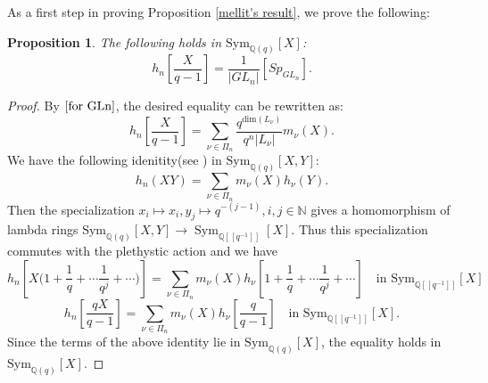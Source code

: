 \documentclass{amsart}
\theoremstyle{plain}
\newtheorem{proposition}{Proposition}[section]
\theoremstyle{definition}
\theoremstyle{remark}
\DeclareMathOperator{\Sym}{Sym}
\begin{document}
As a first step in proving Proposition \ref{mellit's result}, we prove the following:
\begin{proposition}\label{sp=hn}
The following holds in $\text{Sym}_{\mathbb{Q}(q)}[X]$:
\[
h_{n}\left[\frac{X}{q-1}\right]=\frac{1}{|GL_{n}|}[Sp_{GL_{n}}].
\]
\end{proposition}
\begin{proof}
By $\eqref{for GLn}$, the desired equality can be rewritten as:
\begin{equation}\label{0}
h_{n}\left[\frac{X}{q-1}\right]=\displaystyle\sum_{\nu\in\Pi_{n}}\frac{q^{\text{dim}(L_{\nu})}}{q^{n}|L_{\nu}|}m_{\nu}(X).
\end{equation}
We have the following idenitity(see \cite[Chapter 4, Section 2]{Mac}) in $\text{Sym}_{\mathbb{Q}(q)}[X,Y]$:
\begin{equation}\label{3}
    h_n(XY)=\sum_{\nu\in\Pi_{n}}m_{\nu}(X)h_{\nu}(Y).
\end{equation}
Then the specialization $x_{i}\mapsto x_{i},y_{j}\mapsto q^{-(j-1)},i,j\in\mathbb{N}$ gives a homomorphism of lambda rings $\text{Sym}_{\mathbb{Q}(q)}[X,Y]\rightarrow \Sym_{\mathbb{Q}[[q^{-1}]]}[X]$. Thus this specialization commutes with the plethystic action and we have
\[
h_{n}\left[X\bigg(1+\frac{1}{q}+\cdots\frac{1}{q^{j}}+\cdots\bigg)\right]
=
\sum_{\nu\in\Pi_{n}}m_{\nu}(X)h_{\nu}\left[1+\frac{1}{q}+\cdots\frac{1}{q^{j}}+\cdots\right]\quad \text{in } \text{Sym}_{\mathbb{Q}[[q^{-1}]]}[X]
\]
\[
h_{n}\left[\frac{qX}{q-1}\right]
=
\sum_{\nu\in\Pi_{n}}m_{\nu}(X)h_{\nu}\left[\frac{q}{q-1}\right]\quad \text{in } \text{Sym}_{\mathbb{Q}[[q^{-1}]]}[X].
\]
Since the terms of the above identity lie in $\text{Sym}_{\mathbb{Q}(q)}[X]$, the equality holds in $\text{Sym}_{\mathbb{Q}(q)}[X]$.


\end{proof}
\end{document}
